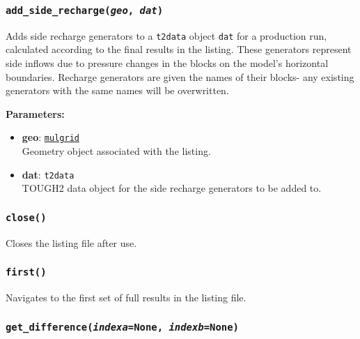 \begin{snugshade}
\subsubsection{\texttt{add\_side\_recharge(\emph{geo}, \emph{dat})}}
\end{snugshade}
\label{sec:t2listing:add_side_recharge}

Adds side recharge generators to a \texttt{t2data} object \texttt{dat} for a production run, calculated according to the final results in the listing.  These generators represent side inflows due to pressure changes in the blocks on the model's horizontal boundaries.  Recharge generators are given the names of their blocks- any existing generators with the same names will be overwritten.

\textbf{Parameters:}
\begin{itemize}
\item \textbf{geo}: \hyperref[mulgrids]{\texttt{mulgrid}}\\
  Geometry object associated with the listing.
\item \textbf{dat}: \texttt{t2data}\\
  TOUGH2 data object for the side recharge generators to be added to.
\end{itemize}

\begin{snugshade}
\subsubsection{\texttt{close()}}
\end{snugshade}
\label{sec:t2listing:close}

Closes the listing file after use.

\begin{snugshade}
\subsubsection{\texttt{first()}}
\end{snugshade}
\label{sec:t2listing:first}

Navigates to the first set of full results in the listing file.

\begin{snugshade}
\subsubsection{\texttt{get\_difference(\emph{indexa}=None, \emph{indexb}=None)}}
\end{snugshade}
\label{sec:t2listing:get_difference}

